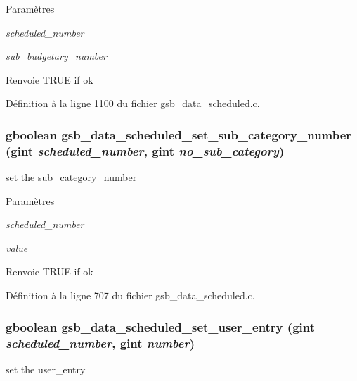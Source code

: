 \begin{DoxyParams}{Paramètres}
\item[{\em scheduled\_\-number}]\item[{\em sub\_\-budgetary\_\-number}]\end{DoxyParams}
\begin{DoxyReturn}{Renvoie}
TRUE if ok 
\end{DoxyReturn}


Définition à la ligne 1100 du fichier gsb\_\-data\_\-scheduled.c.

\subsubsection[{gsb\_\-data\_\-scheduled\_\-set\_\-sub\_\-category\_\-number}]{\setlength{\rightskip}{0pt plus 5cm}gboolean gsb\_\-data\_\-scheduled\_\-set\_\-sub\_\-category\_\-number (gint {\em scheduled\_\-number}, \/  gint {\em no\_\-sub\_\-category})}\label{gsb__data__scheduled_8h_ae7231fb0de3b9b5c8a4f5dfebedfac75}
set the sub\_\-category\_\-number


\begin{DoxyParams}{Paramètres}
\item[{\em scheduled\_\-number}]\item[{\em value}]\end{DoxyParams}
\begin{DoxyReturn}{Renvoie}
TRUE if ok 
\end{DoxyReturn}


Définition à la ligne 707 du fichier gsb\_\-data\_\-scheduled.c.

\subsubsection[{gsb\_\-data\_\-scheduled\_\-set\_\-user\_\-entry}]{\setlength{\rightskip}{0pt plus 5cm}gboolean gsb\_\-data\_\-scheduled\_\-set\_\-user\_\-entry (gint {\em scheduled\_\-number}, \/  gint {\em number})}\label{gsb__data__scheduled_8h_a8fa7fd7b99c2920be933c0865c8b4eb5}
set the user\_\-entry


